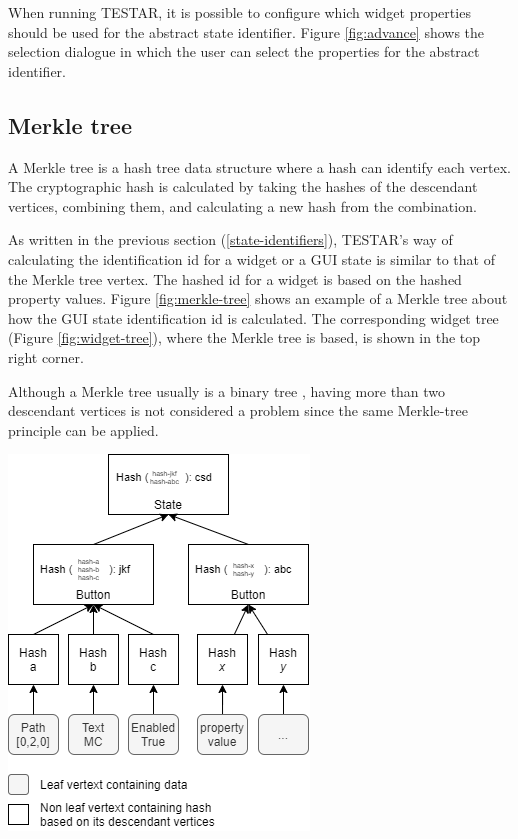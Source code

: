 When running TESTAR, it is possible to configure which widget properties should be used for the abstract state identifier. Figure \ref{fig:advance} shows the selection dialogue in which the user can select the properties for the abstract identifier.

\subsection{Merkle tree} \label{merkle-tree}
A Merkle tree is a hash tree data structure where a hash can identify each vertex. \cite{merkle-tree} The cryptographic hash is calculated by taking the hashes of the descendant vertices, combining them, and calculating a new hash from the combination. 

As written in the previous section (\ref{state-identifiers}), TESTAR's way of calculating the identification id for a widget or a GUI state is similar to that of the Merkle tree vertex. The hashed id for a widget is based on the hashed property values. Figure \ref{fig:merkle-tree} shows an example of a Merkle tree about how the GUI state identification id is calculated. The corresponding widget tree (Figure \ref{fig:widget-tree}), where the Merkle tree is based, is shown in the top right corner.

Although a Merkle tree usually is a binary tree \cite{merkle-tree}, having more than two descendant vertices is not considered a problem since the same Merkle-tree principle can be applied.

\bigskip
\begingroup
\captionsetup{type=figure}
\includegraphics[scale=0.8]{images/merkle-tree-example.png}
\label{fig:merkle-tree}
\endgroup

